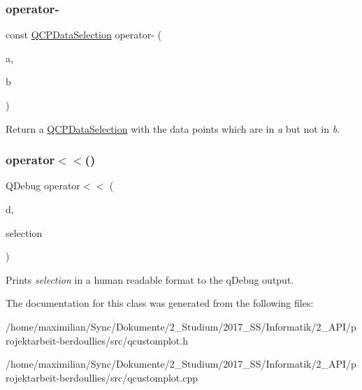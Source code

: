 \subsubsection{\texorpdfstring{operator-\/}{operator-}\hspace{0.1cm}{\footnotesize\ttfamily [4/4]}}
{\footnotesize\ttfamily const \hyperlink{class_q_c_p_data_selection}{Q\+C\+P\+Data\+Selection} operator-\/ (\begin{DoxyParamCaption}\item[{const \hyperlink{class_q_c_p_data_range}{Q\+C\+P\+Data\+Range} \&}]{a,  }\item[{const \hyperlink{class_q_c_p_data_range}{Q\+C\+P\+Data\+Range} \&}]{b }\end{DoxyParamCaption})\hspace{0.3cm}{\ttfamily [friend]}}

Return a \hyperlink{class_q_c_p_data_selection}{Q\+C\+P\+Data\+Selection} with the data points which are in {\itshape a} but not in {\itshape b}. \mbox{\label{class_q_c_p_data_selection_aed65b8988afe6b03adeadf5edf663670}} 
\subsubsection{\texorpdfstring{operator$<$$<$()}{operator<<()}}
{\footnotesize\ttfamily Q\+Debug operator$<$$<$ (\begin{DoxyParamCaption}\item[{Q\+Debug}]{d,  }\item[{const \hyperlink{class_q_c_p_data_selection}{Q\+C\+P\+Data\+Selection} \&}]{selection }\end{DoxyParamCaption})\hspace{0.3cm}{\ttfamily [related]}}

Prints {\itshape selection} in a human readable format to the q\+Debug output. 

The documentation for this class was generated from the following files\+:\begin{DoxyCompactItemize}
\item 
/home/maximilian/\+Sync/\+Dokumente/2\+\_\+\+Studium/2017\+\_\+\+S\+S/\+Informatik/2\+\_\+\+A\+P\+I/projektarbeit-\/berdoullies/src/qcustomplot.\+h\item 
/home/maximilian/\+Sync/\+Dokumente/2\+\_\+\+Studium/2017\+\_\+\+S\+S/\+Informatik/2\+\_\+\+A\+P\+I/projektarbeit-\/berdoullies/src/qcustomplot.\+cpp\end{DoxyCompactItemize}
